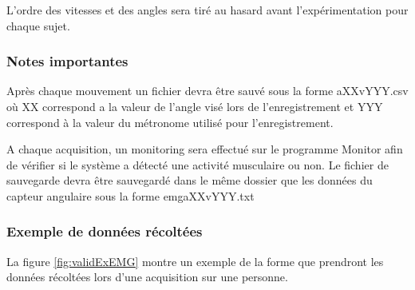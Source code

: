 \documentclass[letterpaper, twoside, 12pt, memoire, creativecommons, hyperref]{thETS}
\begin{document}
L’ordre des vitesses et des angles sera tiré au hasard avant l’expérimentation pour chaque sujet.

\subsubsection{Notes importantes}

Après chaque mouvement un fichier devra être sauvé sous la forme aXXvYYY.csv où XX correspond a la valeur de l’angle visé lors de l’enregistrement et YYY correspond à la valeur du métronome utilisé pour l’enregistrement.

A chaque acquisition, un monitoring sera effectué sur le programme Monitor afin de vérifier si le système a détecté une activité musculaire ou non. Le fichier de sauvegarde devra être sauvegardé dans le même dossier que les données du capteur angulaire sous la forme emgaXXvYYY.txt

\subsubsection{Exemple de données récoltées}

La figure \ref{fig:validExEMG} montre un exemple de la forme que prendront les données récoltées lors d’une acquisition sur une personne. %
\end{document}
